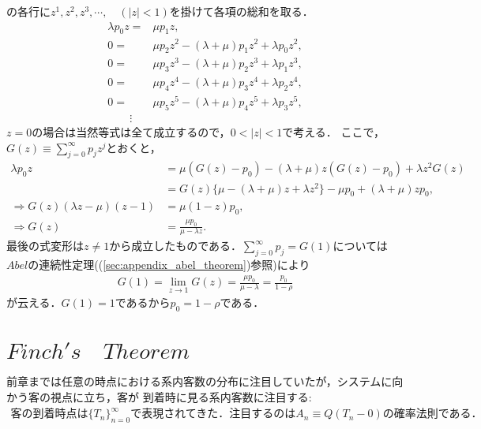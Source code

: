 \documentclass[a4j,papersize,disablejfam,slide,14pt]{jsarticle}
\begin{document}
    の各行に$z^1, z^2, z^3, \cdots, \quad (|z| < 1)$を掛けて各項の総和を取る．
    \begin{align}
    	\lambda p_0 z =& \mu p_1 z, \\
        0 =& \mu p_2 z^2 - (\lambda + \mu) p_1 z^2 + \lambda p_0 z^2, \\
        0 =& \mu p_3 z^3 - (\lambda + \mu) p_2 z^3 + \lambda p_1 z^3, \\
        0 =& \mu p_4 z^4 - (\lambda + \mu) p_3 z^4 + \lambda p_2 z^4, \\
        0 =& \mu p_5 z^5 - (\lambda + \mu) p_4 z^5 + \lambda p_3 z^5, \\
        \qquad \vdots
    \end{align}
    $z=0$の場合は当然等式は全て成立するので，$0 < |z| < 1$で考える．
    ここで，$G(z) \equiv \sum\limits_{j=0}^{\infty} p_j z^j$とおくと，
    \begin{align}
    	\lambda p_0 z &= \mu (G(z) - p_0) - (\lambda + \mu) z (G(z) - p_0) + \lambda z^2 G(z) \\
        &= G(z) \{ \mu - (\lambda + \mu)z + \lambda z^2 \} - \mu p_0 + (\lambda + \mu) z p_0, \\
        \Rightarrow G(z) (\lambda z - \mu)(z - 1) &= \mu (1 - z) p_0, \\
        \Rightarrow G(z) &= \frac{\mu p_0}{\mu - \lambda z}.
    \end{align}
    最後の式変形は$z \neq 1$から成立したものである．$\sum\limits_{j=0}^{\infty} p_j = G(1)$については
    $Abel$の連続性定理((\ref{sec:appendix_abel_theorem})参照)により
    \begin{align}
    	G(1) = \lim\limits_{z \to 1} G(z) = \frac{\mu p_0}{\mu - \lambda} = \frac{p_0}{1 - \rho}
    \end{align}
    が云える．$G(1)=1$であるから$p_0 = 1 - \rho$である．

\section{$Finch's\quad Theorem$}
	前章までは任意の時点における系内客数の分布に注目していたが，システムに向かう客の視点に立ち，客が
    到着時に見る系内客数に注目する: 
    \begin{align}
    	\mbox{客の到着時点は$\{ T_n \}_{n=0}^{\infty}$で表現されてきた．注目するのは$A_n \equiv Q(T_n - 0)$の確率法則である．}
    \end{align}
    \begin{description}
    	\item[$$]
    \end{description}
\end{document}
